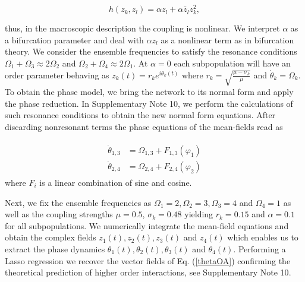 \documentclass[12pt]{article}
\theoremstyle{plain}
\theoremstyle{definition}
\theoremstyle{remark}
\theoremstyle{remark}
\begin{document}
{\begin{linenomath}
\begin{equation}
h(z_k,z_l) = \alpha z_l + \alpha \bar z_l z_k^2, 
\end{equation}
\end{linenomath}
thus, in the macroscopic description the coupling is nonlinear. 
We interpret $\alpha$ as a bifurcation parameter and deal with $\alpha z_l$ as a nonlinear term as in bifurcation theory. We consider the ensemble frequencies to satisfy the resonance conditions $\Omega_1 + \Omega_3 \approx 2\Omega_2$ and $\Omega_2 + \Omega_4 \approx 2\Omega_1$. At $\alpha=0$ each subpopulation will have an order parameter behaving as 
$
z_k(t) = r_k e^{i \theta_k(t)}
$
where
$
r_k = \sqrt{\frac{\mu- \sigma_k}{\mu}}
$
and $\dot \theta_k = \Omega_k$. To obtain the phase model, we bring the network to its normal form and apply the phase reduction.  In  Supplementary Note 10, we perform the calculations of such resonance conditions to obtain the new normal form equations.  After discarding  nonresonant terms the phase equations of the mean-fields read as

\begin{eqnarray}\label{thetaOA}
\begin{split}
\dot{\theta}_{1,3} &= \Omega_{1,3} +F_{1,3}(\varphi_1)\\ 
\dot{\theta}_{2,4} &= \Omega_{2,4} +F_{2,4}(\varphi_2)  
\end{split}
\end{eqnarray}
where $F_i$ is a linear combination of sine and cosine.


Next, we fix the ensemble frequencies as $\Omega_1 = 2, \Omega_2 = 3, \Omega_3 = 4$ and $\Omega_4 = 1$ as well as the coupling strengths $\mu=0.5$, $\sigma_k = 0.48$ yielding $r_k = 0.15$ and $\alpha=0.1$ for all subpopulations.  We numerically integrate the mean-field equations and obtain the complex fields $z_1(t),z_2(t),z_3(t)$ and $z_4(t)$ which enables us to extract the phase dynamics $\theta_1(t),\theta_2(t), \theta_3(t)$ and $\theta_4(t)$. Performing a Lasso regression we recover the vector fields of Eq. (\ref{thetaOA}) confirming the theoretical prediction of higher order interactions,  {see Supplementary Note 10}. 


}
\end{document}
